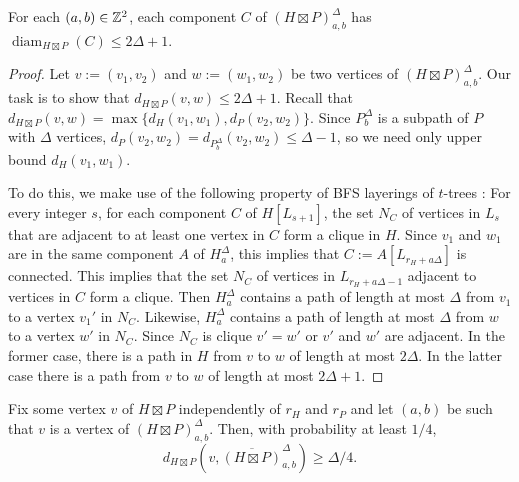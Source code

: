 \documentclass{patmorin}
\renewcommand{\ge}{\geqslant}
\renewcommand{\le}{\leqslant}
\DeclareMathOperator{\diam}{diam}
\begin{document}

\begin{clm}\label{component_diameter}
  For each $(a,b)\in\mathbb{Z}^2$, each component $C$ of $(H\boxtimes P)^\Delta_{a,b}$ has $\diam_{H\boxtimes P}(C)\le 2\Delta+1$.
\end{clm}

\begin{proof}
  Let $v:=(v_1,v_2)$ and $w:=(w_1,w_2)$ be two vertices of $(H\boxtimes P)^\Delta_{a,b}$.  Our task is to show that $d_{H\boxtimes P}(v,w)\le 2\Delta+1$.  Recall that
  $d_{H\boxtimes P}(v,w)=\max\{d_{H}(v_1,w_1),d_{P}(v_2,w_2)\}$.  Since $P^\Delta_b$ is a subpath of $P$ with $\Delta$ vertices, $d_P(v_2,w_2)=d_{P^\Delta_b}(v_2,w_2)\le\Delta-1$, so we need only upper bound $d_{H}(v_1,w_1)$.

  To do this, we make use of the following property of BFS layerings of $t$-trees \cite{KP08,DMW05}:  For every integer $s$,
  for each component $C$ of $H[L_{s+1}]$,
    the set $N_C$ of vertices in $L_{s}$ that are adjacent to at least one vertex in $C$ form a clique in $H$.
  Since $v_1$ and $w_1$ are in the same component $A$ of $H^\Delta_a$, this implies that $C:=A[L_{r_H+a\Delta}]$ is connected.  This implies that the set $N_C$ of vertices in $L_{r_H+a\Delta-1}$ adjacent to vertices in $C$ form a clique.  Then $H^\Delta_a$ contains a path of length at most $\Delta$ from $v_1$ to a vertex $v_1'$ in $N_C$.   Likewise, $H^\Delta_a$ contains a path of length at most $\Delta$ from $w$ to a vertex $w'$ in $N_C$. Since $N_C$ is clique $v'=w'$ or $v'$ and $w'$ are adjacent.  In the former case, there is a path in $H$ from $v$ to $w$ of length at most $2\Delta$. In the latter case there is a path from $v$ to $w$ of length at most $2\Delta+1$.
\end{proof}

\begin{clm}\label{good_probability}
  Fix some vertex $v$ of $H\boxtimes P$ independently of $r_H$ and $r_P$ and let $(a,b)$ be such that $v$ is a vertex of $(H\boxtimes P)^\Delta_{a,b}$.  Then, with probability at least $1/4$,  
  $$d_{H\boxtimes P}(v, \overline{(H\boxtimes P)}^\Delta_{a,b}) \ge \Delta/4.$$
\end{clm}
\end{document}
